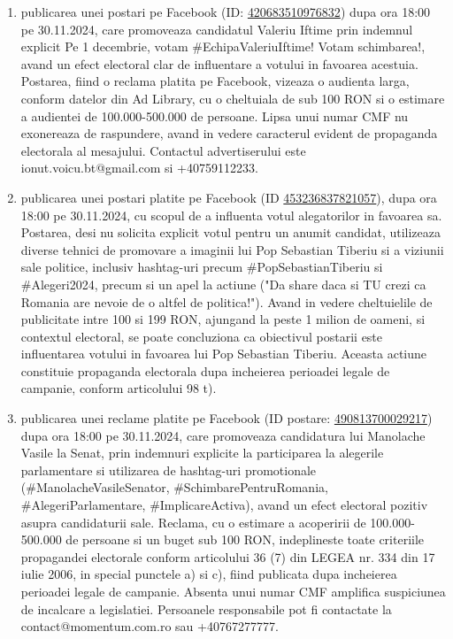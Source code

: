 \documentclass[a4paper,12pt]{article}
\begin{document}
\begin{enumerate}[leftmargin=*, label=\arabic*.)]
    \item publicarea unei postari pe Facebook (ID: \href{https://www.facebook.com/ads/library/?id=420683510976832}{420683510976832}) dupa ora 18:00 pe 30.11.2024, care promoveaza candidatul Valeriu Iftime prin indemnul explicit Pe 1 decembrie, votam \#EchipaValeriuIftime! Votam schimbarea!, avand un efect electoral clar de influentare a votului in favoarea acestuia. Postarea, fiind o reclama platita pe Facebook, vizeaza o audienta larga, conform datelor din Ad Library, cu o cheltuiala de sub 100 RON si o estimare a audientei de 100.000-500.000 de persoane.  Lipsa unui numar CMF nu exonereaza de raspundere, avand in vedere caracterul evident de propaganda electorala al mesajului.  Contactul advertiserului este ionut.voicu.bt@gmail.com si +40759112233.
    \item publicarea unei postari platite pe Facebook (ID \href{https://www.facebook.com/ads/library/?id=453236837821057}{453236837821057}), dupa ora 18:00 pe 30.11.2024, cu scopul de a influenta votul alegatorilor in favoarea sa. Postarea, desi nu solicita explicit votul pentru un anumit candidat, utilizeaza diverse tehnici de promovare a imaginii lui Pop Sebastian Tiberiu si a viziunii sale politice, inclusiv hashtag-uri precum \#PopSebastianTiberiu si \#Alegeri2024, precum si un apel la actiune ("Da share daca si TU crezi ca Romania are nevoie de o altfel de politica!").  Avand in vedere cheltuielile de publicitate intre 100 si 199 RON,  ajungand la peste 1 milion de oameni, si contextul electoral, se poate concluziona ca obiectivul postarii este influentarea votului in favoarea lui Pop Sebastian Tiberiu.  Aceasta actiune constituie propaganda electorala dupa incheierea perioadei legale de campanie, conform articolului 98 t).
    \item publicarea unei reclame platite pe Facebook (ID postare: \href{https://www.facebook.com/ads/library/?id=490813700029217}{490813700029217}) dupa ora 18:00 pe 30.11.2024, care promoveaza candidatura lui Manolache Vasile la Senat,  prin indemnuri explicite la participarea la alegerile parlamentare si utilizarea de hashtag-uri promotionale (\#ManolacheVasileSenator, \#SchimbarePentruRomania, \#AlegeriParlamentare, \#ImplicareActiva), avand un efect electoral pozitiv asupra candidaturii sale.  Reclama, cu o estimare a acoperirii de 100.000-500.000 de persoane si un buget sub 100 RON,  indeplineste toate criteriile propagandei electorale conform articolului 36 (7) din LEGEA nr. 334 din 17 iulie 2006,  in special punctele a) si c),  fiind publicata dupa incheierea perioadei legale de campanie. Absenta unui numar CMF amplifica suspiciunea de incalcare a legislatiei.  Persoanele responsabile pot fi contactate la contact@momentum.com.ro sau +40767277777.

\end{enumerate}
\end{document}
